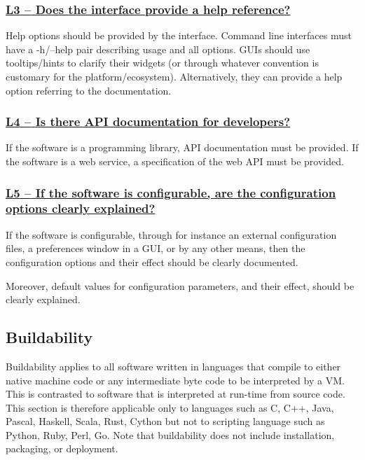 \documentclass[a4paper,11pt]{article}
\newcommand{\indicator}[1]{\subsubsection*{\underline{#1}}}
\begin{document}
\newcommand{\lThreeName}{L3}
\newcommand{\lThreeID}{\lThreeName}
\newcommand{\lThreeText}{Does the interface provide a help reference?}
\indicator{\lThreeName{ }--{ }\lThreeText}\label{id:l3} 

Help options should be provided by the interface. Command line interfaces must
have a -h/--help pair describing usage and all options. GUIs should use tooltips/hints to clarify
their widgets (or through whatever convention is customary for the
platform/ecosystem). Alternatively, they can provide a help option referring to
the documentation.

\newcommand{\lFourName}{L4}
\newcommand{\lFourID}{\lFourName}
\newcommand{\lFourText}{Is there API documentation for developers?}
\indicator{\lFourName{ }--{ }\lFourText}\label{id:l4} 

If the software is a programming library, API documentation must be provided.
If the software is a web service, a specification of the web API must be provided.

\newcommand{\lFiveName}{L5}
\newcommand{\lFiveID}{\lFiveName}
\newcommand{\lFiveText}{If the software is configurable, are the configuration options clearly explained?}
\indicator{\lFiveName{ }--{ }\lFiveText}\label{id:l5} 

%
%

If the software is configurable, through for instance an external configuration
files, a preferences window in a GUI, or by any other means, then the
configuration options and their effect should be clearly documented.

Moreover, default values for configuration parameters, and their effect, should be
clearly explained.

\subsection{Buildability}\label{sec:bui}

Buildability applies to all software written in languages that compile to
either native machine code or any intermediate byte code to be interpreted by a VM.
This is contrasted to software that is interpreted at run-time from source
code. This section is therefore applicable only to languages such as C, C++,
Java, Pascal, Haskell, Scala, Rust, Cython but not to scripting language such
as Python, Ruby, Perl, Go.  Note that buildability does not include
installation, packaging, or deployment.
\end{document}
